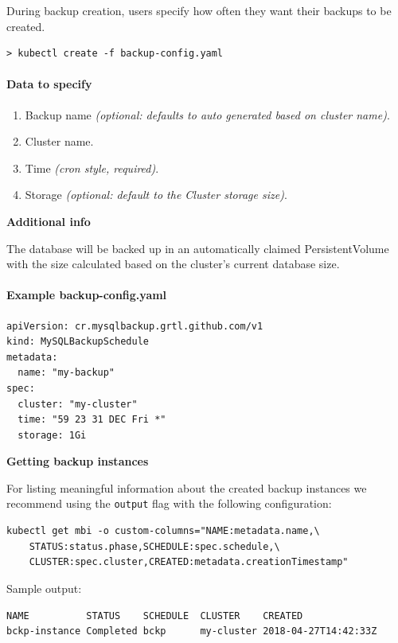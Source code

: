 During backup creation, users specify how often they want their backups
to be created.

\begin{lstlisting}
> kubectl create -f backup-config.yaml
\end{lstlisting}

\paragraph{Data to specify}
\begin{enumerate}
	\item Backup name \textit{(optional: defaults to auto generated based on cluster name)}.
	\item Cluster name.
	\item Time \textit{(cron style, required)}.
	\item Storage \textit{(optional: default to the Cluster storage size)}.
\end{enumerate}

\noindent  \textbf{Additional info}

\noindent The database will be backed up in an automatically claimed PersistentVolume with the size
calculated based on the cluster's current database size.

\paragraph{Example \textbf{backup-config.yaml}}
\begin{lstlisting}[caption=backup-config.yaml,captionpos=b]
apiVersion: cr.mysqlbackup.grtl.github.com/v1
kind: MySQLBackupSchedule
metadata:
  name: "my-backup"
spec:
  cluster: "my-cluster"
  time: "59 23 31 DEC Fri *"
  storage: 1Gi
\end{lstlisting}

\noindent  \textbf{Getting backup instances}

\noindent For listing meaningful information about the created backup instances we recommend
using the \texttt{output} flag with the following configuration:

\begin{lstlisting}
kubectl get mbi -o custom-columns="NAME:metadata.name,\
	STATUS:status.phase,SCHEDULE:spec.schedule,\
	CLUSTER:spec.cluster,CREATED:metadata.creationTimestamp"
\end{lstlisting}

\noindent Sample output:
\begin{lstlisting}
NAME          STATUS    SCHEDULE  CLUSTER    CREATED
bckp-instance Completed bckp      my-cluster 2018-04-27T14:42:33Z
\end{lstlisting}

